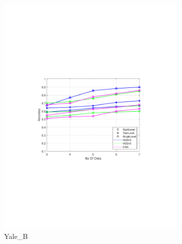 \begin{figure}[ht!]
\begin{subfigure}{.33\textwidth}
		\includegraphics[width=\linewidth, trim=3.8cm 8cm 4cm 8cm, clip=true]{figures/yale_acc}
		\captionsetup{justification=centering}
		\caption{Yale\_B}
		\label{fig:yale_acc}
	\end{subfigure}
	\begin{subfigure}{.33\textwidth}

\end{subfigure}
\end{figure}
